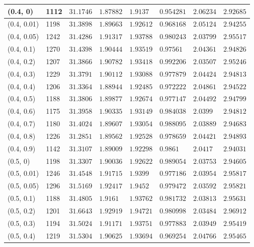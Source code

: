 \begin{center}
{\begin{longtable}{| l | p{} |  p{} | p{} | p{} | p{} | p{} | p{} |}
 (0.4, 0) & 1112  & $31.1746$ & $1.87882$ & $1.9137$ & $0.954281$ & $2.06234$ & $2.92685$ \\ \hline
 (0.4, 0.01) & 1198  & $31.3898$ & $1.89663$ & $1.92612$ & $0.968168$ & $2.05124$ & $2.94255$ \\ \hline
 (0.4, 0.05) & 1242  & $31.4286$ & $1.91317$ & $1.93788$ & $0.980243$ & $2.03799$ & $2.95517$ \\ \hline
 (0.4, 0.1) & 1270  & $31.4398$ & $1.90444$ & $1.93519$ & $0.97561$ & $2.04361$ & $2.94826$ \\ \hline
 (0.4, 0.2) & 1207  & $31.3866$ & $1.90782$ & $1.93418$ & $0.992206$ & $2.03507$ & $2.95246$ \\ \hline
 (0.4, 0.3) & 1229  & $31.3791$ & $1.90112$ & $1.93088$ & $0.977879$ & $2.04424$ & $2.94813$ \\ \hline
 (0.4, 0.4) & 1206  & $31.3364$ & $1.88944$ & $1.92485$ & $0.972222$ & $2.04861$ & $2.94522$ \\ \hline
 (0.4, 0.5) & 1188  & $31.3806$ & $1.89877$ & $1.92674$ & $0.977147$ & $2.04492$ & $2.94799$ \\ \hline
 (0.4, 0.6) & 1175  & $31.3958$ & $1.90335$ & $1.93149$ & $0.984038$ & $2.0399$ & $2.94812$ \\ \hline
 (0.4, 0.7) & 1180  & $31.4024$ & $1.89607$ & $1.93054$ & $0.988095$ & $2.03889$ & $2.94683$ \\ \hline
 (0.4, 0.8) & 1226  & $31.2851$ & $1.89562$ & $1.92528$ & $0.978659$ & $2.04421$ & $2.94893$ \\ \hline
 (0.4, 0.9) & 1142  & $31.3107$ & $1.89009$ & $1.92298$ & $0.9861$ & $2.0417$ & $2.94031$ \\ \hline
 (0.5, 0) & 1198  & $31.3307$ & $1.90036$ & $1.92622$ & $0.989054$ & $2.03753$ & $2.94605$ \\ \hline
 (0.5, 0.01) & 1246  & $31.4548$ & $1.91715$ & $1.9399$ & $0.977186$ & $2.03954$ & $2.95817$ \\ \hline
 (0.5, 0.05) & 1296  & $31.5169$ & $1.92417$ & $1.9452$ & $0.979472$ & $2.03592$ & $2.95821$ \\ \hline
 (0.5, 0.1) & 1188  & $31.4805$ & $1.9161$ & $1.93762$ & $0.981732$ & $2.03813$ & $2.95631$ \\ \hline
 (0.5, 0.2) & 1201  & $31.6643$ & $1.92919$ & $1.94721$ & $0.980998$ & $2.03484$ & $2.96912$ \\ \hline
 (0.5, 0.3) & 1194  & $31.5024$ & $1.91171$ & $1.93751$ & $0.977883$ & $2.03949$ & $2.95419$ \\ \hline
 (0.5, 0.4) & 1219  & $31.5304$ & $1.90625$ & $1.93694$ & $0.969254$ & $2.04766$ & $2.95465$ \\ \hline

\end{longtable}}
\end{center}
